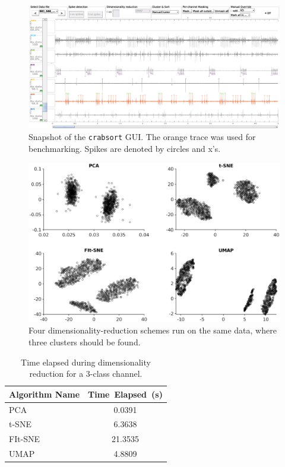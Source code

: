 \documentclass{article}
\begin{document}
\begin{figure}
  \centering
  \includegraphics[width=\textwidth]{gfx/crabsort-2.eps}
  \caption{Snapshot of the \texttt{crabsort} GUI. The orange trace was used for benchmarking. Spikes are denoted by circles and x's.}
  \label{fig:crabsort-1}
\end{figure}

\begin{figure}
  \centering
  \includegraphics[width=\textwidth]{gfx/dim-red-2.eps}
  \caption{Four dimensionality-reduction schemes run on the same data, where three clusters should be found.}
  \label{fig:dim-red-comparison-1}
\end{figure}

\begin{table}
  \caption{Time elapsed during dimensionality reduction for a 3-class channel.}
  \label{tbl:dim-red-time-1}
  \centering
  \begin{tabular}{lS}
    \toprule
    Algorithm Name     & Time~Elapsed~(s) \\
    \midrule
    PCA     & 0.0391 \\
    t-SNE   & 6.3638 \\
    FIt-SNE & 21.3535 \\
    UMAP    & 4.8809 \\
    \bottomrule
  \end{tabular}
\end{table}
\end{document}

